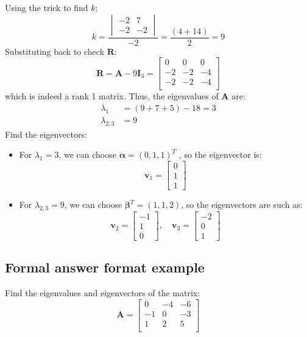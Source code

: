 \documentclass{article}
\begin{document}
Using the trick to find \( k \):
\[
	k = \frac{\begin{vmatrix}
			-2 & 7\\
			-2 & -2
	\end{vmatrix}}{-2}
	= \frac{(4 + 14)}{2} = 9
\]
Substituting back to check \( \boldsymbol R \):
\[
\boldsymbol R = \boldsymbol A - 9 \boldsymbol I_3 =
\begin{bmatrix}
	0 & 0 & 0 \\
	-2 & -2 & -4 \\
	-2 & -2 & -4 \\
\end{bmatrix}
\]
which is indeed a rank 1 matrix.
Thus, the eigenvalues of \( \boldsymbol A \) are:
\[
\begin{aligned}
	\lambda_1 &= (9 + 7 + 5) - 18 = 3 \\
	\lambda_{2,3} &= 9
\end{aligned}
\]
Find the eigenvectors:
\begin{itemize}
		\item For \( \lambda_1 = 3 \), we can choose $\boldsymbol\alpha=(0,1,1)^{T}$ ,
			so the eigenvector is:
			\[
				\boldsymbol v_1 = \begin{bmatrix}
					0 \\ 1 \\ 1
				\end{bmatrix}
			\]
		\item For \( \lambda_{2,3} = 9 \), we can choose $\boldsymbol\beta^{T}= (1,1,2)$, 
			so the eigenvectors are such as:
			\[
				\boldsymbol v_2 = \begin{bmatrix}
					-1 \\ 1 \\ 0
				\end{bmatrix}, \quad
				\boldsymbol v_3 = \begin{bmatrix}
					-2 \\ 0 \\ 1
				\end{bmatrix}
			\]
\end{itemize}

\subsection{Formal answer format example}
Find the eigenvalues and eigenvectors of the matrix:
\[
\boldsymbol A = \begin{bmatrix}
	0 & -4 & -6\\
	-1 & 0 & -3\\
	1 & 2 & 5\\
\end{bmatrix}
\]
\end{document}
